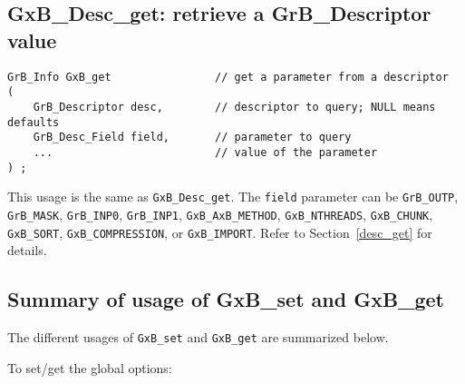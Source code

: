 \documentclass[12pt]{article}
\begin{document}
\newpage
\subsection{{\sf GxB\_Desc\_get:} retrieve a {\sf GrB\_Descriptor} value}

\begin{mdframed}[userdefinedwidth=6in]
{\footnotesize
\begin{verbatim}
GrB_Info GxB_get                // get a parameter from a descriptor
(
    GrB_Descriptor desc,        // descriptor to query; NULL means defaults
    GrB_Desc_Field field,       // parameter to query
    ...                         // value of the parameter
) ;
\end{verbatim} } \end{mdframed}

This usage is the same as \verb'GxB_Desc_get'.  The \verb'field' parameter can
be \verb'GrB_OUTP', \verb'GrB_MASK', \verb'GrB_INP0', \verb'GrB_INP1',
\verb'GxB_AxB_METHOD',
\verb'GxB_NTHREADS',
\verb'GxB_CHUNK',
\verb'GxB_SORT',
\verb'GxB_COMPRESSION', or
\verb'GxB_IMPORT'.
Refer to Section~\ref{desc_get} for details.

\subsection{Summary of usage of {\sf GxB\_set} and {\sf GxB\_get}}

The different usages of \verb'GxB_set' and \verb'GxB_get' are summarized below.

\noindent
To set/get the global options:
\end{document}
